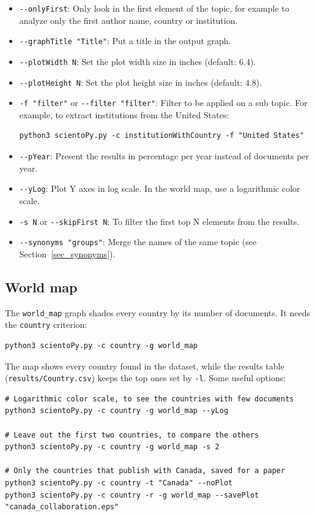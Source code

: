 \documentclass[10pt,letterpaper]{article}
\begin{document}
\begin{itemize}
\item \verb|--onlyFirst|: Only look in the first element of the topic, for example to analyze only the first author name, country or institution.
\item \verb|--graphTitle "Title"|: Put a title in the output graph.
\item \verb|--plotWidth N|: Set the plot width size in inches (default: 6.4).
\item \verb|--plotHeight N|: Set the plot height size in inches (default: 4.8).
\item \verb|-f "filter"| or \verb|--filter "filter"|: Filter to be applied on a sub topic. For example, to extract institutions from the United States:
\begin{verbatim}
python3 scientoPy.py -c institutionWithCountry -f "United States"
\end{verbatim}
\item \verb|--pYear|: Present the results in percentage per year instead of documents per year.
\item \verb|--yLog|: Plot Y axes in log scale. In the world map, use a logarithmic color scale.
\item \verb|-s N| or \verb|--skipFirst N|: To filter the first top N elements from the results.
\item \verb|--synonyms "groups"|: Merge the names of the same topic (see Section~\ref{sec_synonyms}).
\end{itemize}

\subsection{World map}
\label{sec_world_map}

The \verb|world_map| graph shades every country by its number of documents. It needs the \verb|country| criterion:

\begin{verbatim}
python3 scientoPy.py -c country -g world_map
\end{verbatim}

The map shows every country found in the dataset, while the results table (\verb|results/Country.csv|) keeps the top ones set by \verb|-l|. Some useful options:

\begin{verbatim}
# Logarithmic color scale, to see the countries with few documents
python3 scientoPy.py -c country -g world_map --yLog

# Leave out the first two countries, to compare the others
python3 scientoPy.py -c country -g world_map -s 2

# Only the countries that publish with Canada, saved for a paper
python3 scientoPy.py -c country -t "Canada" --noPlot
python3 scientoPy.py -c country -r -g world_map --savePlot "canada_collaboration.eps"
\end{verbatim}
\end{document}

